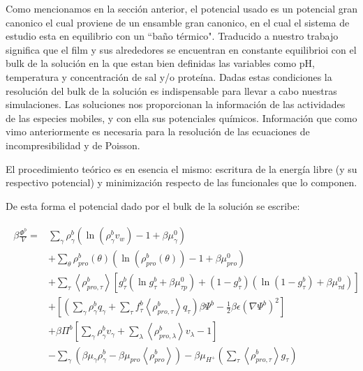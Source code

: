 Como mencionamos en la secci\'on anterior, el potencial usado es un potencial gran canonico el cual proviene de un ensamble gran canonico, en el cual el sistema de estudio  esta en equilibrio con un ``ba\~no t\'ermico". Traducido a nuestro trabajo significa que el film y sus alrededores se encuentran en constante equilibrioi con el bulk de la soluci\'on en la que estan bien definidas las variables como pH, temperatura y concentraci\'on de sal y/o prote\'ina. 
Dadas estas condiciones la resoluci\'on del bulk de la soluci\'on es indispensable para llevar a cabo nuestras simulaciones. Las soluciones nos proporcionan la informaci\'on de las actividades de las especies mobiles, y con ella sus potenciales qu\'imicos. Informaci\'on que como vimo anteriormente es necesaria para la resolución de las ecuaciones de incompresibilidad y de Poisson.

El procedimiento te\'orico es en esencia el mismo: escritura de la energ\'ia libre (y su respectivo potencial) y minimizaci\'on respecto de las funcionales  que lo componen.

De esta forma el potencial dado por el bulk de la soluci\'on se escribe:

\begin{align}
	\begin{aligned}
		\beta\frac{ \Phi^b}{V}=  & \sum_{\gamma}{\rho^b_\gamma\left(\ln \left(\rho^b_\gamma v_w\right) -1 + \beta\mu^0_\gamma\right)} \\
		&+ \sum_{\theta}{\rho^b_{pro}(\theta)\left(\ln \left(\rho^b_{pro}(\theta)\right) -1 + \beta\mu^0_{pro} \right)} \\
		& + \sum_\tau \left<\rho^b_{pro,\tau}\right> \left[g^b_\tau(\ln g^b_\tau+ \beta\mu^0_{\tau p}) +(1-g^b_\tau)(\ln (1-g^b_\tau)+\beta\mu^0_{\tau d})\right]   \\
		& +\left[\left(\sum_{\gamma } {\rho^b_\gamma q_\gamma + \sum_\tau{f^b_\tau \left<\rho^b_{pro,\tau}\right> q_\tau} }\right)\beta\Psi^b -\frac{1}{2}\beta\epsilon(\nabla\Psi^b)^2 \right] \\ 
		& +\beta\Pi^b{\left[\sum_{\gamma}\rho^b_\gamma v_\gamma + \sum_\lambda{\left<\rho^b_{pro,\lambda}\right>v_\lambda}  -1 \right]} \\
		&   -\sum_\gamma \left(\beta \mu_\gamma \rho^b_\gamma - \beta \mu_{pro} \left<\rho^b_{pro}\right> \right)   -\beta\mu_{H^+} \left( \sum_\tau\left< \rho^b_{pro,\tau} \right>g_\tau  \right )
	\end{aligned}
	\label{eq:film:pot-bulk}
\end{align}

